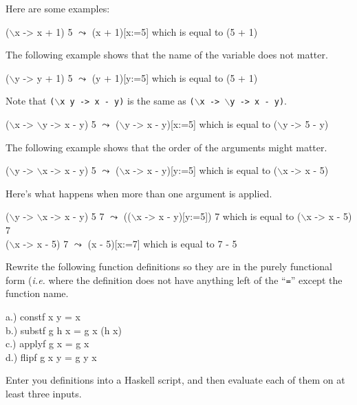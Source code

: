 \documentclass[11pt]{article}
\begin{document}
\begin{example}
Here are some examples:
\begin{program*}
\>  ($\backslash$x -> x + 1) 5   $\leadsto$  (x + 1)[x:=5] {\rm{which is equal to}} (5 + 1)  
\end{program*}
The following example shows that the name of the variable does not matter.
\begin{program*}
\>  ($\backslash$y -> y + 1) 5   $\leadsto$  (y + 1)[y:=5] {\rm{which is equal to}} (5 + 1)  
\end{program*}

Note that {\tt{($\backslash$x y -> x - y)}} is the same as {\tt{($\backslash$x -> $\backslash$y -> x - y)}}.
\begin{program*}
\>  ($\backslash$x -> $\backslash$y -> x - y) 5   $\leadsto$  ($\backslash$y -> x - y)[x:=5] {\rm{which is equal to}} ($\backslash$y -> 5 - y) 
\end{program*}

The following example shows that the order of the arguments might matter.
\begin{program*}
\>  ($\backslash$y -> $\backslash$x -> x - y) 5   $\leadsto$  ($\backslash$x -> x - y)[y:=5] {\rm{which is equal to}} ($\backslash$x -> x - 5)
\end{program*}

Here's what happens when more than one argument is applied.
\begin{program*}
\>  ($\backslash$y -> $\backslash$x -> x - y) 5 7   $\leadsto$  (($\backslash$x -> x - y)[y:=5]) 7 {\rm{which is equal to}} ($\backslash$x -> x - 5) 7 \\
\>  ($\backslash$x -> x - 5) 7 $\leadsto$ (x - 5)[x:=7] {\rm{which is equal to}} 7 - 5 \\
\end{program*}

\end{example}


\begin{exercise}
\label{ex1}
Rewrite the following function definitions so they are in the purely functional
form ({\em{i.e.}}  where the definition does not have anything left of the
``{\tt{=}}'' except the function name.
\begin{program*}
\> {\rm{ a.)}}  constf x y = x \\
\> {\rm{ b.)}}  substf g h x = g x (h x) \\
\> {\rm{ c.)}}  applyf g x = g x \\
\> {\rm{ d.)}}  flipf g x y  = g y x \\
\end{program*}
Enter you definitions into a Haskell script, and then evaluate each of them on at least three inputs.
\end{exercise}
\end{document}
